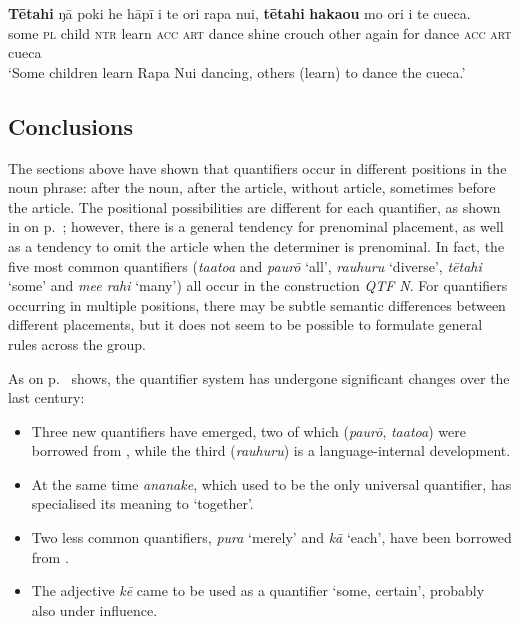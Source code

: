 \ea\label{ex:4.124}
\gll \textbf{Tētahi} ŋā poki he hāpī i te {\ꞌ}ori rapa nui, \textbf{tētahi} \textbf{haka{\ꞌ}ou} mo {\ꞌ}ori  i te cueca.\\
some \textsc{pl} child \textsc{ntr} learn \textsc{acc} \textsc{art} dance shine crouch other again for dance  \textsc{acc} \textsc{art} cueca\\

\glt 
‘Some children learn Rapa Nui dancing, others (learn) to dance the cueca.’ \textstyleExampleref{[R334.131]} 
\z

\subsection{Conclusions}\label{sec:4.4.11}

The sections above have shown that quantifiers occur in different positions in the noun phrase: after the noun, after the article, without article, sometimes before the article. The positional possibilities are different for each quantifier, as shown in  on p.~\pageref{tab:30}; however, there is a general tendency for prenominal placement, as well as a tendency to omit the article when the determiner is prenominal. In fact, the five most common quantifiers (\textit{ta{\ꞌ}ato{\ꞌ}a} and \textit{paurō} ‘all’, \textit{rauhuru} ‘diverse’, \textit{tētahi} ‘some’ and \textit{me{\ꞌ}e rahi} ‘many’) all occur in the construction \textit{QTF N}. For quantifiers occurring in multiple positions, there may be subtle semantic differences between different placements, but it does not seem to be possible to formulate general rules across the group. 

As  on p.~\pageref{tab:28} shows, the quantifier system has undergone significant changes over the last century: 

\begin{itemize}
\item 
Three new quantifiers have emerged, two of which (\textit{paurō}, \textit{ta{\ꞌ}ato{\ꞌ}a}) were borrowed from , while the third (\textit{rauhuru}) is a language-internal development. 

\item 
At the same time \textit{ananake}, which used to be the only universal quantifier, has specialised its meaning to ‘together’. 

\item 
Two less common quantifiers, \textit{pura} ‘merely’ and \textit{kā} ‘each’, have been borrowed from . 

\item 
The adjective \textit{kē} came to be used as a quantifier ‘some, certain’, probably also under  influence.

\end{itemize}

